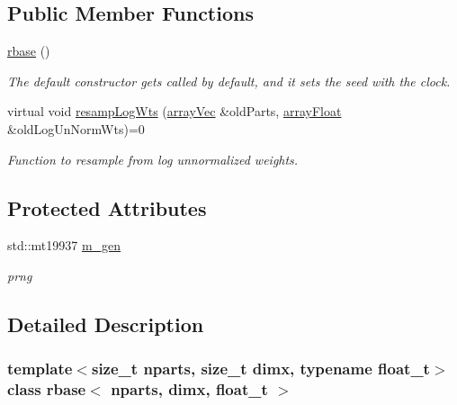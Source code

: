 \subsection*{Public Member Functions}
\begin{DoxyCompactItemize}
\item 
\mbox{\label{classrbase_aae80801bfc60ee3573cb728fc9460b0c}} 
\hyperlink{classrbase_aae80801bfc60ee3573cb728fc9460b0c}{rbase} ()
\begin{DoxyCompactList}\small\item\em The default constructor gets called by default, and it sets the seed with the clock. \end{DoxyCompactList}\item 
virtual void \hyperlink{classrbase_aff0f6f88fd4656e67f5ebc870f10dd44}{resamp\+Log\+Wts} (\hyperlink{classrbase_aa12fc826befa6ba0647b5f59ebc396ee}{array\+Vec} \&old\+Parts, \hyperlink{classrbase_a6f76bef853e508cb5b6f546d231b06f5}{array\+Float} \&old\+Log\+Un\+Norm\+Wts)=0
\begin{DoxyCompactList}\small\item\em Function to resample from log unnormalized weights. \end{DoxyCompactList}\end{DoxyCompactItemize}
\subsection*{Protected Attributes}
\begin{DoxyCompactItemize}
\item 
\mbox{\label{classrbase_ac278c975bd5b23ad009f1ce685552c5c}} 
std\+::mt19937 \hyperlink{classrbase_ac278c975bd5b23ad009f1ce685552c5c}{m\+\_\+gen}
\begin{DoxyCompactList}\small\item\em prng \end{DoxyCompactList}\end{DoxyCompactItemize}


\subsection{Detailed Description}
\subsubsection*{template$<$size\+\_\+t nparts, size\+\_\+t dimx, typename float\+\_\+t$>$\newline
class rbase$<$ nparts, dimx, float\+\_\+t $>$}

